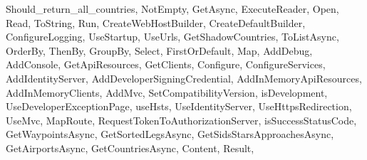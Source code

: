 {{	Should_return_all_countries, NotEmpty, GetAsync, ExecuteReader, Open, Read, ToString,
	Run, CreateWebHostBuilder, CreateDefaultBuilder, ConfigureLogging, UseStartup, UseUrls,
	GetShadowCountries, ToListAsync, OrderBy, ThenBy, GroupBy, Select, FirstOrDefault, Map,
	AddDebug, AddConsole, GetApiResources, GetClients, Configure, ConfigureServices,
	AddIdentityServer, AddDeveloperSigningCredential, AddInMemoryApiResources, AddInMemoryClients,
	AddMvc, SetCompatibilityVersion, isDevelopment, UseDeveloperExceptionPage, useHsts,
	UseIdentityServer, UseHttpsRedirection, UseMvc, MapRoute, RequestTokenToAuthorizationServer,
	isSuccessStatusCode, GetWaypointsAsync, GetSortedLegsAsync, GetSidsStarsApproachesAsync,
	GetAirportsAsync, GetCountriesAsync, Content, Result},
}